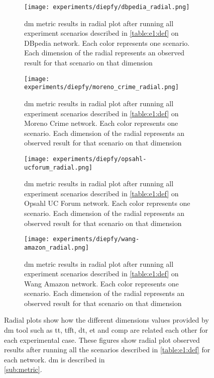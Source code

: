 \begin{figure}[!htp]
  \centering
  \begin{subfigure}[t]{0.45\textwidth}
  \texttt{[image: experiments/diepfy/dbpedia\_radial.png]}
    \caption[{[EE] \acrshort{dm} Results (Radial): \acrshort{dbpedia}}]{\acrshort{dm} metric results in radial plot after running all experiment scenarios described in \autoref{table:e1:def} on DBpedia network. Each color represents one scenario. Each dimension of the radial represents an observed result for that scenario on that dimension}
    \label{fig:dief:dbpedia-radial}
  \end{subfigure}\hfill
  \begin{subfigure}[t]{0.45\textwidth}
  \texttt{[image: experiments/diepfy/moreno\_crime\_radial.png]}
    \caption[{[EE] \acrshort{dm} Results (Radial): Moreno Crime}]{\acrshort{dm} metric results in radial plot after running all experiment scenarios described in \autoref{table:e1:def} on Moreno Crime network. Each color represents one scenario. Each dimension of the radial represents an observed result for that scenario on that dimension}
    \label{fig:dief:moreno-radial}
  \end{subfigure}
  \vspace{0.5cm}
  \begin{subfigure}[t]{0.45\textwidth}
  \texttt{[image: experiments/diepfy/opsahl-ucforum\_radial.png]}
    \caption[{[EE] \acrshort{dm} Results (Radial): Opsahl UC Forum}]{\acrshort{dm} metric results in radial plot after running all experiment scenarios described in \autoref{table:e1:def} on Opsahl UC Forum network. Each color represents one scenario. Each dimension of the radial represents an observed result for that scenario on that dimension}
    \label{fig:dief:opsahl-radial}
  \end{subfigure}\hfill
  \begin{subfigure}[t]{0.45\textwidth}
    \texttt{[image: experiments/diepfy/wang-amazon\_radial.png]}
    \caption[{[EE] \acrshort{dm} Results (Radial): Wang Amazon}]{\acrshort{dm} metric results in radial plot after running all experiment scenarios described in \autoref{table:e1:def} on Wang Amazon network. Each color represents one scenario. Each dimension of the radial represents an observed result for that scenario on that dimension}
    \label{fig:dief:wang-radial}
  \end{subfigure}
  \caption[{[EE] \acrshort{dm} General Results (Radial)}]{Radial plots show how the different dimensions values provided by \acrshort{dm} tool such as \acrfull{tt}, \acrfull{tfft}, \acrfull{dt}, \acrfull{et} and \acrfull{comp} are related each other for each experimental case. These figures show radial plot observed results after running all the scenarios described in \autoref{table:e1:def} for each network. \acrshort{dm} is described in \\ \autoref{sub:metric}.}
\end{figure}

